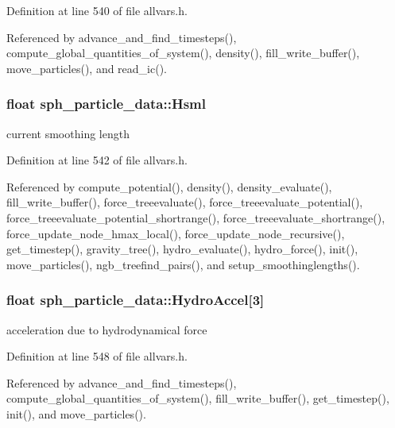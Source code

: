 Definition at line 540 of file allvars.h.



Referenced by advance\_\-and\_\-find\_\-timesteps(), compute\_\-global\_\-quantities\_\-of\_\-system(), density(), fill\_\-write\_\-buffer(), move\_\-particles(), and read\_\-ic().

\hypertarget{structsph__particle__data_af9efa599cdd656b26a0df5f89430b4d1}{
\subsubsection[{Hsml}]{\setlength{\rightskip}{0pt plus 5cm}float {\bf sph\_\-particle\_\-data::Hsml}}}
\label{structsph__particle__data_af9efa599cdd656b26a0df5f89430b4d1}
current smoothing length 

Definition at line 542 of file allvars.h.



Referenced by compute\_\-potential(), density(), density\_\-evaluate(), fill\_\-write\_\-buffer(), force\_\-treeevaluate(), force\_\-treeevaluate\_\-potential(), force\_\-treeevaluate\_\-potential\_\-shortrange(), force\_\-treeevaluate\_\-shortrange(), force\_\-update\_\-node\_\-hmax\_\-local(), force\_\-update\_\-node\_\-recursive(), get\_\-timestep(), gravity\_\-tree(), hydro\_\-evaluate(), hydro\_\-force(), init(), move\_\-particles(), ngb\_\-treefind\_\-pairs(), and setup\_\-smoothinglengths().

\hypertarget{structsph__particle__data_aa3441b1ee8351048b3dcac10b36b0b6c}{
\subsubsection[{HydroAccel}]{\setlength{\rightskip}{0pt plus 5cm}float {\bf sph\_\-particle\_\-data::HydroAccel}\mbox{[}3\mbox{]}}}
\label{structsph__particle__data_aa3441b1ee8351048b3dcac10b36b0b6c}
acceleration due to hydrodynamical force 

Definition at line 548 of file allvars.h.



Referenced by advance\_\-and\_\-find\_\-timesteps(), compute\_\-global\_\-quantities\_\-of\_\-system(), fill\_\-write\_\-buffer(), get\_\-timestep(), init(), and move\_\-particles().

